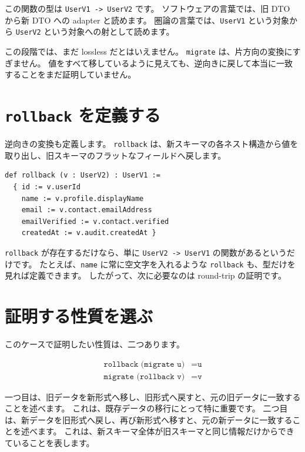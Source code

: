 この関数の型は \texttt{UserV1 -> UserV2} です。
ソフトウェアの言葉では、旧 DTO から新 DTO への adapter と読めます。
圏論の言葉では、\texttt{UserV1} という対象から \texttt{UserV2} という対象への射として読めます。

この段階では、まだ lossless だとはいえません。
\texttt{migrate} は、片方向の変換にすぎません。
値をすべて移しているように見えても、逆向きに戻して本当に一致することをまだ証明していません。

\section{\texttt{rollback} を定義する}

逆向きの変換も定義します。
\texttt{rollback} は、新スキーマの各ネスト構造から値を取り出し、旧スキーマのフラットなフィールドへ戻します。

\begin{listing}[htbp]
\begin{verbatim}
def rollback (v : UserV2) : UserV1 :=
  { id := v.userId
    name := v.profile.displayName
    email := v.contact.emailAddress
    emailVerified := v.contact.verified
    createdAt := v.audit.createdAt }
\end{verbatim}
\caption{\texttt{rollback}}
\label{lst:ch28-rollback}
\end{listing}

\texttt{rollback} が存在するだけなら、単に \texttt{UserV2 -> UserV1} の関数があるというだけです。
たとえば、\texttt{name} に常に空文字を入れるような \texttt{rollback} も、型だけを見れば定義できます。
したがって、次に必要なのは round-trip の証明です。

\section{証明する性質を選ぶ}

このケースで証明したい性質は、二つあります。

\begin{align*}
\texttt{rollback (migrate u)} &= \texttt{u} \\
\texttt{migrate (rollback v)} &= \texttt{v}
\end{align*}

一つ目は、旧データを新形式へ移し、旧形式へ戻すと、元の旧データに一致することを述べます。
これは、既存データの移行にとって特に重要です。
二つ目は、新データを旧形式へ戻し、再び新形式へ移すと、元の新データに一致することを述べます。
これは、新スキーマ全体が旧スキーマと同じ情報だけからできていることを表します。

